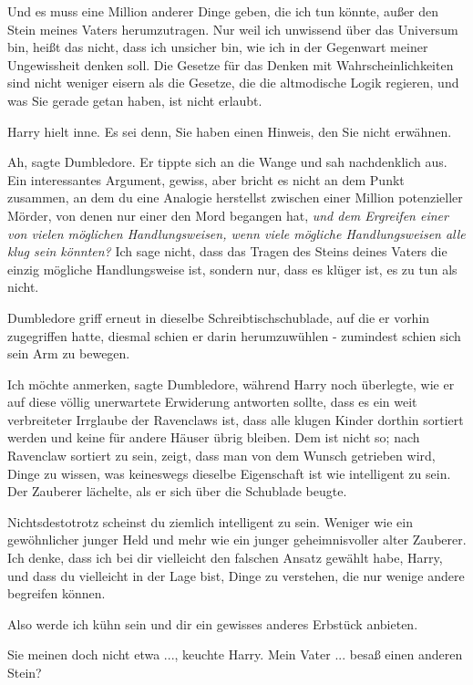Und es muss eine Million anderer Dinge geben, die ich tun könnte, außer den
Stein meines Vaters herumzutragen. Nur weil ich unwissend über das Universum
bin, heißt das nicht, dass ich unsicher bin, wie ich in der Gegenwart meiner
Ungewissheit denken soll. Die Gesetze für das Denken mit Wahrscheinlichkeiten
sind nicht weniger eisern als die Gesetze, die die altmodische Logik regieren,
und was Sie gerade getan haben, ist nicht erlaubt.\grqq{}

Harry hielt inne. \glqq Es sei denn, Sie haben einen Hinweis, den Sie nicht
erwähnen.\grqq{}

\glqq Ah\grqq{}, sagte Dumbledore. Er tippte sich an die Wange und sah
nachdenklich aus. \glqq Ein interessantes Argument, gewiss, aber bricht es nicht
an dem Punkt zusammen, an dem du eine Analogie herstellst zwischen einer Million
potenzieller Mörder, von denen nur einer den Mord begangen hat, \emph{und dem
Ergreifen einer von vielen möglichen Handlungsweisen, wenn viele mögliche
Handlungsweisen alle klug sein könnten? } Ich sage nicht, dass das Tragen des
Steins deines Vaters die einzig mögliche Handlungsweise ist, sondern nur, dass
es klüger ist, es zu tun als nicht.\grqq{}

Dumbledore griff erneut in dieselbe Schreibtischschublade, auf die er vorhin
zugegriffen hatte, diesmal schien er darin herumzuwühlen - zumindest schien sich
sein Arm zu bewegen.

\glqq Ich möchte anmerken\grqq{}, sagte Dumbledore, während Harry noch
überlegte, wie er auf diese völlig unerwartete Erwiderung antworten sollte,
\glqq dass es ein weit verbreiteter Irrglaube der Ravenclaws ist, dass alle
klugen Kinder dorthin sortiert werden und keine für andere Häuser übrig bleiben.
Dem ist nicht so; nach Ravenclaw sortiert zu sein, zeigt, dass man von dem
Wunsch getrieben wird, Dinge zu wissen, was keineswegs dieselbe Eigenschaft ist
wie intelligent zu sein.\grqq{} Der Zauberer lächelte, als er sich über die
Schublade beugte.

\glqq Nichtsdestotrotz scheinst du ziemlich intelligent zu sein. Weniger wie ein
gewöhnlicher junger Held und mehr wie ein junger geheimnisvoller alter Zauberer.
Ich denke, dass ich bei dir vielleicht den falschen Ansatz gewählt habe, Harry,
und dass du vielleicht in der Lage bist, Dinge zu verstehen, die nur wenige
andere begreifen können.

Also werde ich kühn sein und dir ein gewisses anderes Erbstück anbieten.\grqq{}

\glqq Sie meinen doch nicht etwa ...\grqq{}, keuchte Harry. \glqq Mein Vater ...
besaß einen anderen Stein?\grqq{}

